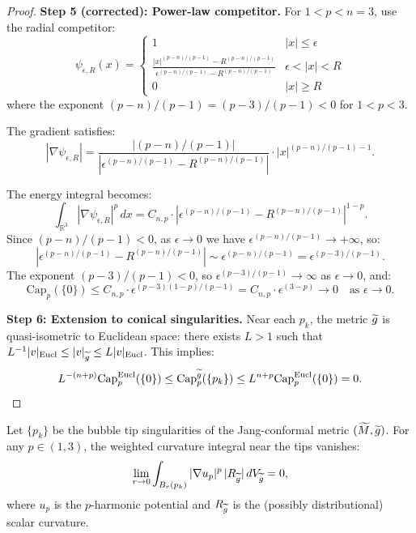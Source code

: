 \begin{proof}
\textbf{Step 5 (corrected): Power-law competitor.}
For $1 < p < n = 3$, use the radial competitor:
\begin{equation}
    \psi_{\epsilon,R}(x) = \begin{cases}
        1 & |x| \le \epsilon \\
        \displaystyle\frac{|x|^{(p-n)/(p-1)} - R^{(p-n)/(p-1)}}{\epsilon^{(p-n)/(p-1)} - R^{(p-n)/(p-1)}} & \epsilon < |x| < R \\
        0 & |x| \ge R
    \end{cases}
\end{equation}
where the exponent $(p-n)/(p-1) = (p-3)/(p-1) < 0$ for $1 < p < 3$.

The gradient satisfies:
\begin{equation}
    |\nabla \psi_{\epsilon,R}| = \frac{|(p-n)/(p-1)|}{|\epsilon^{(p-n)/(p-1)} - R^{(p-n)/(p-1)}|} \cdot |x|^{(p-n)/(p-1)-1}.
\end{equation}

The energy integral becomes:
\begin{equation}
    \int_{\mathbb{R}^3} |\nabla \psi_{\epsilon,R}|^p \, dx = C_{n,p} \cdot \left| \epsilon^{(p-n)/(p-1)} - R^{(p-n)/(p-1)} \right|^{1-p}.
\end{equation}
Since $(p-n)/(p-1) < 0$, as $\epsilon \to 0$ we have $\epsilon^{(p-n)/(p-1)} \to +\infty$, so:
\begin{equation}
    \left| \epsilon^{(p-n)/(p-1)} - R^{(p-n)/(p-1)} \right| \sim \epsilon^{(p-n)/(p-1)} = \epsilon^{(p-3)/(p-1)}.
\end{equation}
The exponent $(p-3)/(p-1) < 0$, so $\epsilon^{(p-3)/(p-1)} \to \infty$ as $\epsilon \to 0$, and:
\begin{equation}
    \text{Cap}_p(\{0\}) \le C_{n,p} \cdot \epsilon^{(p-3)(1-p)/(p-1)} = C_{n,p} \cdot \epsilon^{(3-p)} \to 0 \quad \text{as } \epsilon \to 0.
\end{equation}

\textbf{Step 6: Extension to conical singularities.}
Near each $p_k$, the metric $\widetilde{g}$ is quasi-isometric to Euclidean space: there exists $L > 1$ such that $L^{-1}|v|_{\text{Eucl}} \le |v|_{\widetilde{g}} \le L|v|_{\text{Eucl}}$. This implies:
\begin{equation}
    L^{-(n+p)} \text{Cap}_p^{\text{Eucl}}(\{0\}) \le \text{Cap}_p^{\widetilde{g}}(\{p_k\}) \le L^{n+p} \text{Cap}_p^{\text{Eucl}}(\{0\}) = 0.
\end{equation}
\end{proof}

\begin{lemma}\label{lem:BubbleTipCurvatureVanishing}
Let $\{p_k\}$ be the bubble tip singularities of the Jang-conformal metric $(\widetilde{M}, \widetilde{g})$. For any $p \in (1, 3)$, the weighted curvature integral near the tips vanishes:
\begin{equation}\label{eq:BubbleTipCurvatureVanishing}
    \lim_{r \to 0} \int_{B_r(p_k)} |\nabla u_p|^p \, |R_{\widetilde{g}}| \, dV_{\widetilde{g}} = 0,
\end{equation}
where $u_p$ is the $p$-harmonic potential and $R_{\widetilde{g}}$ is the (possibly distributional) scalar curvature.
\end{lemma}

